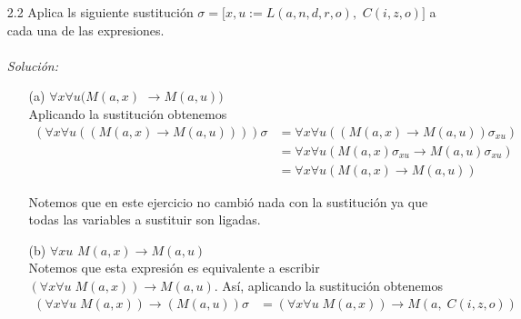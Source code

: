 \documentclass[letterpaper,11pt]{article}
\begin{document}
\begin{enumerate}
\begin{itemize}
\begin{enumerate}
                \item[2.2] Aplica ls siguiente sustitución 
                $\sigma = [x, u := L(a,n,d,r,o),$ $C(i,z,o)]$ a cada una 
                de las expresiones. \\ \\
                \textit{Solución:}
                \begin{itemize}
                    \item[(a)] $\forall x \forall u (M(a,x)$ 
                    $\rightarrow M(a,u))$ \\
                    Aplicando la sustitución obtenemos 
                    \begin{align*}
                        (\forall x \forall u ((M(a,x) 
                        \rightarrow M(a,u)))) \sigma
                        &= \forall x \forall u ((M(a,x) 
                        \rightarrow M(a,u)) \sigma_{xu}) \\
                        &= \forall x \forall u (M(a,x) \sigma_{xu} 
                        \rightarrow M(a,u) \sigma_{xu}) \\
                        &= \forall x \forall u (M(a,x) \rightarrow M(a,u))
                    \end{align*}

                    Notemos que en este ejercicio no cambió nada con la 
                    sustitución ya que todas las variables a sustituir son 
                    ligadas. 

                    \item[(b)] $\forall xu$ $M(a,x) \rightarrow M(a,u)$ \\
                    Notemos que esta expresión es equivalente a escribir 
                    $(\forall x \forall u \; M(a,x)) \rightarrow M(a,u)$. Así,
                    aplicando la sustitución obtenemos 
                    \begin{align*}
                        (\forall x \forall u \; M(a,x)) 
                        \rightarrow (M(a,u)) \sigma
                        &= (\forall x \forall u \; M(a,x))
                        \rightarrow M(a, \; C(i,z,o)) 
                    \end{align*}


\end{itemize}
\end{enumerate}
\end{itemize}
\end{enumerate}
\end{document}
